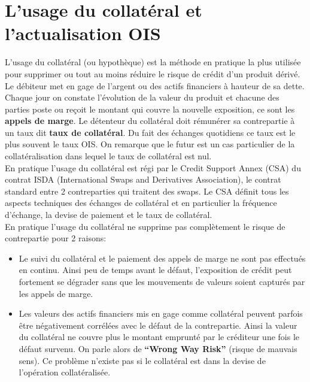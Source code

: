 \documentclass{article}
\begin{document}
\section*{L’usage du collatéral et l’actualisation OIS}

L’usage du collatéral (ou hypothèque) est la méthode en pratique la plus utilisée pour supprimer ou tout au moins réduire le risque de crédit d'un produit dérivé. Le débiteur met en gage de l’argent ou des actifs financiers à hauteur de sa dette. Chaque jour on constate l’évolution de la valeur du produit et chacune des parties poste ou reçoit le montant qui couvre la nouvelle exposition, ce sont les \textbf{appels de marge}. Le détenteur du collatéral doit rémunérer sa contrepartie à un taux dit \textbf{taux de collatéral}. Du fait des échanges quotidiens ce taux est le plus souvent le taux OIS. On remarque que le futur est un cas particulier de la collatéralisation dans lequel le taux de collatéral est nul.\\

En pratique l’usage du collatéral est régi par le Credit Support Annex (CSA) du contrat ISDA (International Swaps and Derivatives Association), le contrat standard entre 2 contreparties qui traitent des swaps. Le CSA définit tous les aspects techniques des échanges de collatéral et en particulier la fréquence d'échange, la devise de paiement et le taux de collatéral.\\

En pratique l’usage du collatéral ne supprime pas complètement le risque de contrepartie pour 2 raisons:
\begin{itemize}

\item Le suivi du collatéral et le paiement des appels de marge ne sont pas effectués en continu. Ainsi peu de temps avant le défaut, l’exposition de crédit peut fortement se dégrader sans que les mouvements de valeurs soient capturés par les appels de marge.\\

\item Les valeurs des actifs financiers mis en gage comme collatéral peuvent parfois être négativement corrélées avec le défaut de la contrepartie. Ainsi la valeur du collatéral ne couvre plus le montant emprunté par le créditeur une fois le défaut survenu. On parle alors de \textbf{“Wrong Way Risk”} (risque de mauvais sens). Ce problème n’existe pas si le collatéral est dans la devise de l’opération collatéralisée.\\

\end{itemize}
\end{document}
